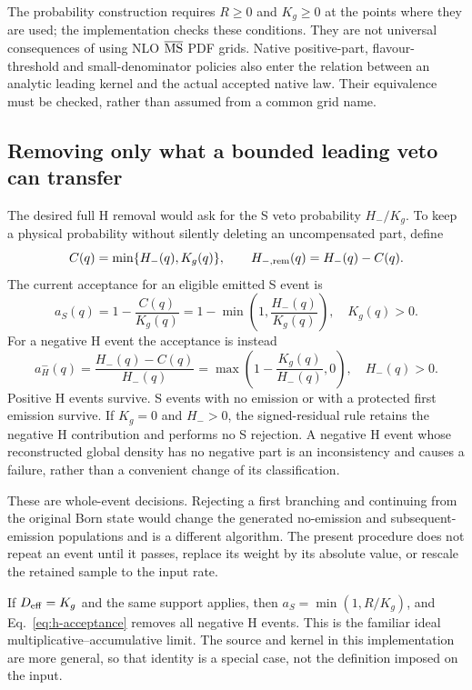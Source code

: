 The probability construction requires $R\geq0$ and $K_g\geq0$ at the
points where they are used; the implementation checks these conditions.
They are not universal consequences of using NLO $\overline{\rm MS}$ PDF
grids. Native positive-part, flavour-threshold and small-denominator
policies also enter the relation between an analytic leading kernel and
the actual accepted native law. Their equivalence must be checked, rather
than assumed from a common grid name.

\subsection{Removing only what a bounded leading veto can transfer}
The desired full H removal would ask for the S veto probability
$H_-/K_g$. To keep a physical probability without silently deleting an
uncompensated part, define
\begin{equation}
 C(q)=\min\{H_-(q),K_g(q)\},\qquad
 H_{-,\rm rem}(q)=H_-(q)-C(q).
 \label{eq:bounded-transfer}
\end{equation}
The current acceptance for an eligible emitted S event is
\begin{equation}
 a_S(q)=1-\frac{C(q)}{K_g(q)}
       =1-\min\!\left(1,\frac{H_-(q)}{K_g(q)}\right),
 \quad K_g(q)>0.
 \label{eq:s-acceptance}
\end{equation}
For a negative H event the acceptance is instead
\begin{equation}
 a_H^-(q)=\frac{H_-(q)-C(q)}{H_-(q)}
 =\max\!\left(1-\frac{K_g(q)}{H_-(q)},0\right),
 \quad H_-(q)>0.
 \label{eq:h-acceptance}
\end{equation}
Positive H events survive. S events with no emission or with a protected
first emission survive. If $K_g=0$ and $H_->0$, the signed-residual rule
retains the negative H contribution and performs no S rejection. A
negative H event whose reconstructed global density has no negative part
is an inconsistency and causes a failure, rather than a convenient
change of its classification.

These are whole-event decisions. Rejecting a first branching and
continuing from the original Born state would change the generated
no-emission and subsequent-emission populations and is a different
algorithm. The present procedure does not repeat an event until it
passes, replace its weight by its absolute value, or rescale the retained
sample to the input rate.

If $D_{\rm eff}=K_g$ and the same support applies, then
$a_S=\min(1,R/K_g)$, and Eq.~\eqref{eq:h-acceptance} removes all negative
H events. This is the familiar ideal multiplicative--accumulative limit.
The source and kernel in this implementation are more general, so that
identity is a special case, not the definition imposed on the input.

